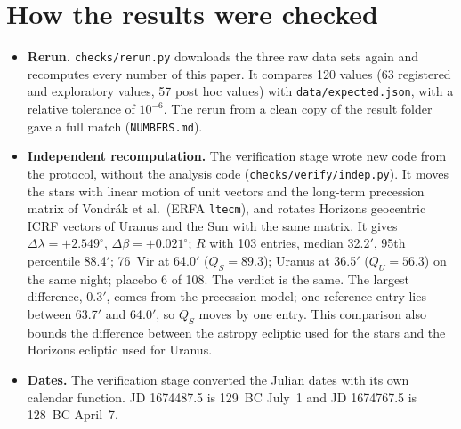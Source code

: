 \documentclass[11pt]{article}
\newcommand{\am}{$'$}
\begin{document}
\section{How the results were checked}\label{sec:checks}
\begin{itemize}
\item \textbf{Rerun.} \texttt{checks/rerun.py} downloads the three raw data sets again and recomputes every number of this paper. It compares 120 values (63 registered and exploratory values, 57 post hoc values) with \texttt{data/expected.json}, with a relative tolerance of $10^{-6}$. The rerun from a clean copy of the result folder gave a full match (\texttt{NUMBERS.md}).
\item \textbf{Independent recomputation.} The verification stage wrote new code from the protocol, without the analysis code (\texttt{checks/verify/indep.py}). It moves the stars with linear motion of unit vectors and the long-term precession matrix of Vondr\'ak et al.\ (ERFA \texttt{ltecm}), and rotates Horizons geocentric ICRF vectors of Uranus and the Sun with the same matrix. It gives $\Delta\lambda=+2.549^\circ$, $\Delta\beta=+0.021^\circ$; $R$ with 103 entries, median 32.2\am, 95th percentile 88.4\am; 76~Vir at 64.0\am{} ($Q_S=89.3$); Uranus at 36.5\am{} ($Q_U=56.3$) on the same night; placebo 6 of 108. The verdict is the same. The largest difference, 0.3\am, comes from the precession model; one reference entry lies between 63.7\am{} and 64.0\am, so $Q_S$ moves by one entry. This comparison also bounds the difference between the astropy ecliptic used for the stars and the Horizons ecliptic used for Uranus.
\item \textbf{Dates.} The verification stage converted the Julian dates with its own calendar function. JD 1674487.5 is 129~BC July~1 and JD 1674767.5 is 128~BC April~7.
\end{itemize}
\end{document}

